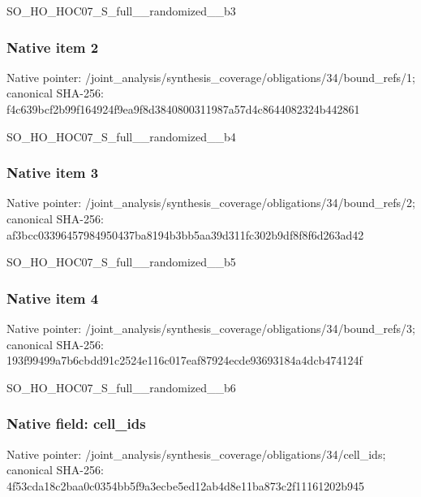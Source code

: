 \documentclass[10pt,a4paper]{article}
\begin{document}
\begingroup\raggedright\sloppy SO\_\allowbreak{}HO\_\allowbreak{}HOC07\_\allowbreak{}S\_\allowbreak{}full\_\allowbreak{}\_\allowbreak{}randomized\_\allowbreak{}\_\allowbreak{}b3\par\endgroup

\subsubsection{Native item 2}
Native pointer: /joint\_\allowbreak{}analysis/synthesis\_\allowbreak{}coverage/obligations/34/bound\_\allowbreak{}refs/1; canonical SHA-256: f4c639bcf2b99f164924f9ea9f8d3840800311987a57d4c8644082324b442861

\begingroup\raggedright\sloppy SO\_\allowbreak{}HO\_\allowbreak{}HOC07\_\allowbreak{}S\_\allowbreak{}full\_\allowbreak{}\_\allowbreak{}randomized\_\allowbreak{}\_\allowbreak{}b4\par\endgroup

\subsubsection{Native item 3}
Native pointer: /joint\_\allowbreak{}analysis/synthesis\_\allowbreak{}coverage/obligations/34/bound\_\allowbreak{}refs/2; canonical SHA-256: af3bcc03396457984950437ba8194b3bb5aa39d311fc302b9df8f8f6d263ad42

\begingroup\raggedright\sloppy SO\_\allowbreak{}HO\_\allowbreak{}HOC07\_\allowbreak{}S\_\allowbreak{}full\_\allowbreak{}\_\allowbreak{}randomized\_\allowbreak{}\_\allowbreak{}b5\par\endgroup

\subsubsection{Native item 4}
Native pointer: /joint\_\allowbreak{}analysis/synthesis\_\allowbreak{}coverage/obligations/34/bound\_\allowbreak{}refs/3; canonical SHA-256: 193f99499a7b6cbdd91c2524e116c017eaf87924ecde93693184a4dcb474124f

\begingroup\raggedright\sloppy SO\_\allowbreak{}HO\_\allowbreak{}HOC07\_\allowbreak{}S\_\allowbreak{}full\_\allowbreak{}\_\allowbreak{}randomized\_\allowbreak{}\_\allowbreak{}b6\par\endgroup

\subsubsection{Native field: cell\_\allowbreak{}ids}
Native pointer: /joint\_\allowbreak{}analysis/synthesis\_\allowbreak{}coverage/obligations/34/cell\_\allowbreak{}ids; canonical SHA-256: 4f53cda18c2baa0c0354bb5f9a3ecbe5ed12ab4d8e11ba873c2f11161202b945
\end{document}
